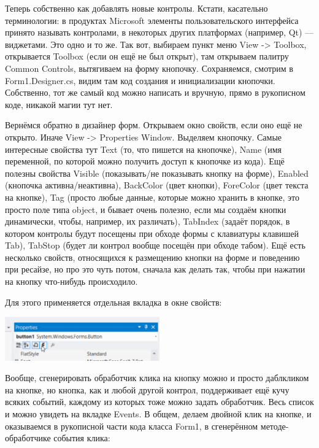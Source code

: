 \documentclass{../../text-style}
\begin{document}
Теперь собственно как добавлять новые контролы. Кстати, касательно терминологии: в продуктах Microsoft элементы пользовательского интерфейса принято называть контролами, в некоторых других платформах (например, Qt) --- виджетами. Это одно и то же. Так вот, выбираем пункт меню View -> Toolbox, открывается Toolbox (если он ещё не был открыт), там открываем палитру Common Controls, вытягиваем на форму кнопочку. Сохраняемся, смотрим в Form1.Designer.cs, видим там код создания и инициализации кнопочки. Собственно, тот же самый код можно написать и вручную, прямо в рукописном коде, никакой магии тут нет. 

Вернёмся обратно в дизайнер форм. Открываем окно свойств, если оно ещё не открыто. Иначе View -> Properties Window. Выделяем кнопочку. Самые интересные свойства тут Text (то, что пишется на кнопочке), Name (имя переменной, по которой можно получить доступ к кнопочке из кода). Ещё полезны свойства Visible (показывать/не показывать кнопку на форме), Enabled (кнопочка активна/неактивна), BackColor (цвет кнопки), ForeColor (цвет текста на кнопке), Tag (просто любые данные, которые можно хранить в кнопке, это просто поле типа object, и бывает очень полезно, если мы создаём кнопки динамически, чтобы, например, их различать), TabIndex (задаёт порядок, в котором контролы будут посещены при обходе формы с клавиатуры клавишей Tab), TabStop (будет ли контрол вообще посещён при обходе табом). Ещё есть несколько свойств, относящихся к размещению кнопки на форме и поведению при ресайзе, но про это чуть потом, сначала как делать так, чтобы при нажатии на кнопку что-нибудь происходило.

Для этого применяется отдельная вкладка в окне свойств:

\begin{center}
    \includegraphics[width=0.5\textwidth]{events.png}
\end{center}

Вообще, сгенерировать обработчик клика на кнопку можно и просто даблкликом на кнопке, но кнопка, как и любой другой контрол, поддерживает ещё кучу всяких событий, каждому из которых тоже можно задать обработчик. Весь список и можно увидеть на вкладке Events. В общем, делаем двойной клик на кнопке, и оказываемся в рукописной части кода класса Form1, в сгенерённом методе-обработчике события клика:
\end{document}

